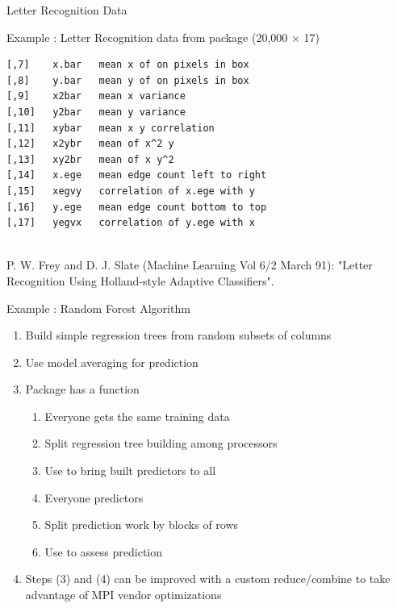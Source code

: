 \begin{frame}[fragile]{Letter Recognition Data}
\begin{exampleblock}{Example \countex : Letter Recognition data from
      package  (20,000 $\times$ 17)}
\begin{minipage}{0.69\textwidth}
\begin{lstlisting}
[,7]	x.bar	mean x of on pixels in box
[,8]	y.bar	mean y of on pixels in box
[,9]	x2bar	mean x variance
[,10]	y2bar	mean y variance
[,11]	xybar	mean x y correlation
[,12]	x2ybr	mean of x^2 y
[,13]	xy2br	mean of x y^2
[,14]	x.ege	mean edge count left to right
[,15]	xegvy	correlation of x.ege with y
[,16]	y.ege	mean edge count bottom to top
[,17]	yegvx	correlation of y.ege with x
      \end{lstlisting}
    \end{minipage} \\
    {\tiny P. W. Frey and D. J. Slate (Machine Learning Vol 6/2 March 91):
    "Letter Recognition Using Holland-style Adaptive Classifiers".}
  \end{exampleblock}
\end{frame}


\begin{frame}
  \begin{exampleblock}{Example \showex : Random Forest Algorithm}\pause
    \begin{enumerate}
     \item Build simple regression trees from random subsets of
       columns
     \item Use model averaging for prediction
     \item Package  has a  function
       \begin{enumerate}
       \item Everyone gets the same training data
       \item Split regression tree building among processors
       \item Use  to bring built predictors to all
       \item Everyone  predictors
       \item Split prediction work by blocks of rows
       \item Use  to assess prediction
       \end{enumerate}
     \item Steps (3) and (4) can be improved with a custom
       reduce/combine to take advantage of MPI vendor optimizations
    \end{enumerate}
  \end{exampleblock}
\end{frame}



